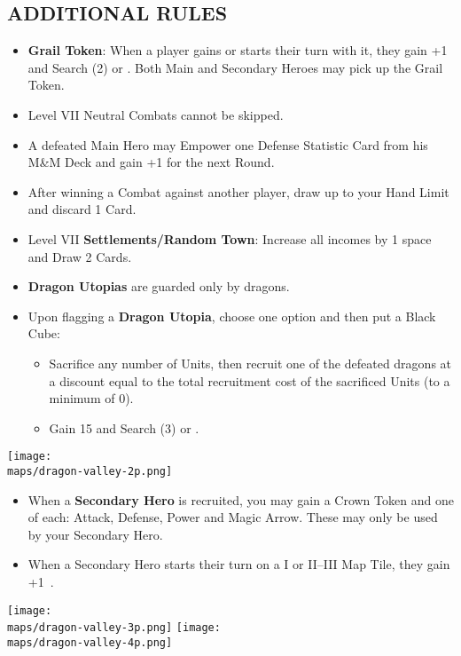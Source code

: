 \begin{multicols*}{2}
\subsection*{\MakeUppercase{Additional Rules}}
\begin{itemize}
  \item \textbf{Grail Token}: When a player gains or starts their turn with it, they gain +1  and Search (2)  or . Both Main and Secondary Heroes may pick up the Grail Token.
  \item Level VII Neutral Combats cannot be skipped.
  \item A defeated Main Hero may Empower one Defense Statistic Card from his M\&M Deck and gain +1  for the next Round.
  \item After winning a Combat against another player, draw up to your Hand Limit and discard 1 Card.
  \item Level VII \textbf{Settlements/Random Town}: Increase all incomes by 1 space and Draw 2 Cards.
  \item \textbf{Dragon Utopias} are guarded only by dragons.
  \item Upon flagging a \textbf{Dragon Utopia}, choose one option and then put a Black Cube:
  \begin{itemize}
    \item Sacrifice any number of Units, then recruit one of the defeated dragons at a discount equal to the total recruitment cost of the sacrificed Units (to a minimum of 0).
    \item Gain 15  and Search (3)  or .
  \end{itemize}
\end{itemize}

\begin{center}
  \vspace*{\fill}
  \texttt{[image: \\maps/dragon-valley-2p.png]}
\end{center}

\begin{itemize}
  \item When a \textbf{Secondary Hero} is recruited, you may gain a Crown Token and one of each: Attack, Defense, Power and Magic Arrow. These may only be used by your Secondary Hero.
  \item When a Secondary Hero starts their turn on a I or II--III Map Tile, they gain +1~.
\end{itemize}

\begin{center}
  \vspace*{\fill}
  \texttt{[image: \\maps/dragon-valley-3p.png]}
  \vspace*{\fill}
  \texttt{[image: \\maps/dragon-valley-4p.png]}
\end{center}

\end{multicols*}
